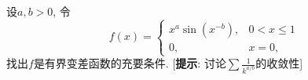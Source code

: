 


\begin{exercise} %
    设$a,b>0$, 令
    $$f(x)=\begin{cases}
        x^a \sin (x^{-b}), & 0 < x \leq 1 \\
        0,          & x = 0,
    \end{cases}$$
    找出$f$是有界变差函数的充要条件.
    {[\textbf{提示}: 讨论$\displaystyle{\sum \frac{1}{k^{a/b}}}$的收敛性]}
\end{exercise}